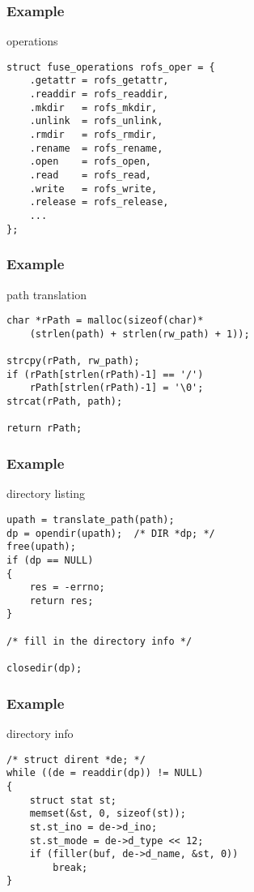 \documentclass[dvipsnames]{beamer}
\begin{document}
\begin{frame}[fragile]
  \frametitle{Example}

  \begin{exampleblock}{operations}
    \begin{lstlisting}
struct fuse_operations rofs_oper = {
    .getattr = rofs_getattr,
    .readdir = rofs_readdir,
    .mkdir   = rofs_mkdir,
    .unlink  = rofs_unlink,
    .rmdir   = rofs_rmdir,
    .rename  = rofs_rename,
    .open    = rofs_open,
    .read    = rofs_read,
    .write   = rofs_write,
    .release = rofs_release,
    ...
};
    \end{lstlisting}
  \end{exampleblock}
\end{frame}

\begin{frame}[fragile]
  \frametitle{Example}

  \begin{exampleblock}{path translation}
    \begin{lstlisting}
char *rPath = malloc(sizeof(char)*
    (strlen(path) + strlen(rw_path) + 1));

strcpy(rPath, rw_path);
if (rPath[strlen(rPath)-1] == '/')
    rPath[strlen(rPath)-1] = '\0';
strcat(rPath, path);

return rPath;
    \end{lstlisting}
  \end{exampleblock}
\end{frame}

\begin{frame}[fragile]
  \frametitle{Example}

  \begin{exampleblock}{directory listing}
    \begin{lstlisting}
upath = translate_path(path);
dp = opendir(upath);  /* DIR *dp; */
free(upath);
if (dp == NULL)
{
    res = -errno;
    return res;
}

/* fill in the directory info */

closedir(dp);
    \end{lstlisting}
  \end{exampleblock}
\end{frame}

\begin{frame}[fragile]
  \frametitle{Example}

  \begin{exampleblock}{directory info}
    \begin{lstlisting}
/* struct dirent *de; */
while ((de = readdir(dp)) != NULL)
{
    struct stat st;
    memset(&st, 0, sizeof(st));
    st.st_ino = de->d_ino;
    st.st_mode = de->d_type << 12;
    if (filler(buf, de->d_name, &st, 0))
        break;
}
    \end{lstlisting}
  \end{exampleblock}
\end{frame}
\end{document}
